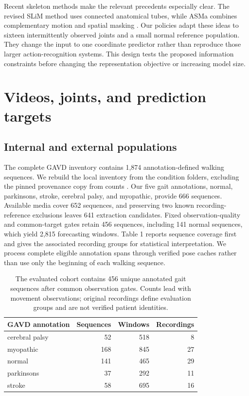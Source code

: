 \documentclass[letterpaper]{article}
\begin{document}
Recent skeleton methods make the relevant precedents especially clear. The revised SLiM method uses connected anatomical tubes, while ASMa combines complementary motion and spatial masking \citep{do2026,anand2026}. Our policies adapt these ideas to sixteen intermittently observed joints and a small normal reference population. They change the input to one coordinate predictor rather than reproduce those larger action-recognition systems. This design tests the proposed information constraints before changing the representation objective or increasing model size.

\section{Videos, joints, and prediction targets}

\subsection{Internal and external populations}

The complete GAVD inventory contains 1,874 annotation-defined walking sequences. We rebuild the local inventory from the condition folders, excluding the pinned provenance copy from counts \citep{ranjan2025}. Our five gait annotations, normal, parkinsons, stroke, cerebral palsy, and myopathic, provide 666 sequences. Available media cover 652 sequences, and preserving two known recording-reference exclusions leaves 641 extraction candidates. Fixed observation-quality and common-target gates retain 456 sequences, including 141 normal sequences, which yield 2,815 forecasting windows. Table 1 reports sequence coverage first and gives the associated recording groups for statistical interpretation. We process complete eligible annotation spans through verified pose caches rather than use only the beginning of each walking sequence.

\begin{table}[t]
\centering
\footnotesize
\setlength{\tabcolsep}{3pt}
\begin{tabular}{>{\raggedright\arraybackslash}p{}rrr}
\toprule
GAVD annotation & Sequences & Windows & Recordings \\
\midrule
cerebral palsy & 52 & 518 & 8 \\
myopathic & 168 & 845 & 27 \\
normal & 141 & 465 & 29 \\
parkinsons & 37 & 292 & 11 \\
stroke & 58 & 695 & 16 \\
\bottomrule
\end{tabular}
\caption{The evaluated cohort contains 456 unique annotated gait sequences after common observation gates. Counts lead with movement observations; original recordings define evaluation groups and are not verified patient identities.}
\label{tab:cohort}
\end{table}
\end{document}
